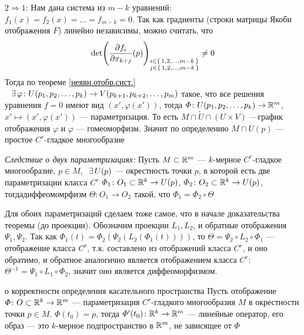 \begin{prf}
	$2 \Rightarrow 1$: Нам дана система из $m - k$ уравнений: $f_1(x) = f_2(x) = \ldots = f_{m - k} = 0$. Так как градиенты (строки матрицы Якоби отображения $F$) линейно независимы, можно считать, что 
	\[\det \Biggl(\frac{\partial f_i}{\partial x_{k + j}}(p)\Biggr)_{\substack{i \in \{\,1, 2, \ldots, m - k \, \} \\ j \in \{\,1, 2, \ldots, m - k \, \}}} \ne 0\]
	Тогда по теореме \ref{неявн.отобр.сист.}$\hspace{7pt plus 1pt minus 2pt} \exists \, \varphi \colon U(p_1, p_2, \ldots, p_k) \to V(p_{k + 1}, p_{k + 2}, \ldots, p_m)$ такое, что все решения уравнения $f = 0$ имеют вид $(x', \varphi(x'))$, тогда $\varPhi \colon U(p_1, p_2, \ldots, p_k) \to \mathbb R^m$, $x' \mapsto (x', \varphi(x'))$ --- параметризация. То есть $M \cap \widetilde U \cap (U \times V)$ ---график отображения $\varphi$ и $\varphi$ --- гомеоморфизм. Значит по определению $M \cap U(p)$ --- простое $C^r$-гладкое многообразие
 \end{prf}
 
\begin{slv}[https://www.youtube.com/live/12hotjT3VcQ?si=1Y-eMslNFh6KOyKt&t=4413]\label{две параметр.}
	\textit{Следствие о двух параметризациях:} Пусть $M \subset \mathbb R^m$ --- $k$-мерное $C^r$-гладкое многообразие, $p \in M$,$\E U(p)$ --- окрестность точки $p$, в которой есть две параметризации класса $C^r$ $\varPhi_1 \colon O_1 \subset \mathbb R^k \to U(p)$,
	$\varPhi_2 \colon O_2 \subset \mathbb R^k \to U(p)$, тогда\E диффеомомрфизм $\Theta \colon O_1 \to O_2$ такой, что $\varPhi_1 = \varPhi_2 \circ \Theta$
\end{slv}

\begin{prf}
	Для обоих параметризаций сделаем тоже самое, что в начале доказательства теоремы (до проекции). Обозначим проекции $L_1, L_2$, и обратные отображения $\Psi_1, \Psi_2$. Так как $\varPhi_1(t) = \varPhi_2(\Psi_2(L_2(\varPhi_1(t))))$, то $\Theta = \Psi_2 \circ L_2 \circ \varPhi_1$ --- отображение класса $C^r$, т.к. составлено из отображений класса $C^r$, и оно обратимо, и обратное аналогично является отображением класса $C^r$: $\Theta^{-1} = \Psi_1 \circ L_1 \circ \varPhi_2$, значит оно является диффеоморфизмом.
\end{prf}

\begin{lem}[https://www.youtube.com/live/fxcRXGVCVFE?si=btHq7rqK3PNeKCDR&t=691]{о корректности определения касательного пространства}
	Пусть отображение $\varPhi \colon O \subset \mathbb R^k \to \mathbb R^m$ --- параметризация $C^r$-гладкого многообразия $M$ в окрестности точки $p \in M$. $\varPhi(t_0) = p$, тогда $\varPhi'(t_0) \colon \mathbb R^k \to \mathbb R^m$ --- линейные оператор, его образ --- это $k$-мерное подпространство в $\mathbb R^m$, не зависящее от $\varPhi$
\end{lem}

